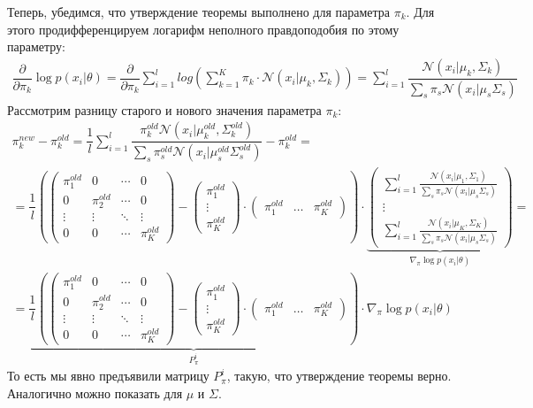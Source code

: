 \documentclass[12pt,fleqn]{article}
\begin{document}
\begin{vkProof}
Теперь, убедимся, что утверждение теоремы выполнено для параметра $\pi_k$. Для этого продифференцируем логарифм неполного правдоподобия по этому параметру:
\begin{gather*}
\dfrac{\partial}{\partial \pi_k} \log p(x_i|\theta) = \dfrac{\partial}{\partial \pi_k} \sum\limits_{i=1}^l log\left(\sum\limits_{k=1}^K \pi_k \cdot \mathcal{N}(x_i|\mu_k,\Sigma_k)\right)=\sum\limits_{i=1}^l
\dfrac{\mathcal{N}(x_i|\mu_{k}, \Sigma_{k})}{\sum\limits_{s}\pi_s \mathcal{N}(x_i|\mu_{s}\Sigma_{s})}
\end{gather*}
Рассмотрим разницу старого и нового значения параметра $\pi_k$:
\begin{gather*}
\pi_k^{new}-\pi_k^{old} = \dfrac{1}{l}\sum\limits_{i=1}^l
\dfrac{\pi_k^{old} \mathcal{N}(x_i|\mu_{k}^{old}, \Sigma_{k}^{old})}{\sum\limits_{s}\pi_s^{old} \mathcal{N}(x_i|\mu_{s}^{old}\Sigma_{s}^{old})} - \pi_k^{old}=\\
=\dfrac{1}{l}\left(\begin{pmatrix}
\pi_1^{old}&0&\cdots &0\\ 
0&\pi_2^{old}&\cdots &0\\
\vdots &\vdots &\ddots &\vdots \\
0&0&\cdots & \pi_K^{old}
\end{pmatrix} - \begin{pmatrix}
\pi_1^{old}\\ 
\vdots\\
\pi_K^{old}
\end{pmatrix} \cdot \begin{pmatrix}
\pi_1^{old} & \ldots & \pi_K^{old}
\end{pmatrix}\right) \cdot \underbrace{\begin{pmatrix}
\sum\limits_{i=1}^l
\frac{\mathcal{N}(x_i|\mu_{1}, \Sigma_{1})}{\sum\limits_{s}\pi_s \mathcal{N}(x_i|\mu_{s}\Sigma_{s})}\\ 
\vdots\\
\sum\limits_{i=1}^l
\frac{\mathcal{N}(x_i|\mu_{K}, \Sigma_{K})}{\sum\limits_{s}\pi_s \mathcal{N}(x_i|\mu_{s}\Sigma_{s})}
\end{pmatrix} }_{\nabla_{\pi}\log p(x_i|\theta)}=\\
=\underbrace{\dfrac{1}{l}\left(\begin{pmatrix}
\pi_1^{old}&0&\cdots &0\\ 
0&\pi_2^{old}&\cdots &0\\
\vdots &\vdots &\ddots &\vdots \\
0&0&\cdots & \pi_K^{old}
\end{pmatrix} - \begin{pmatrix}
\pi_1^{old}\\ 
\vdots\\
\pi_K^{old}
\end{pmatrix} \cdot \begin{pmatrix}
\pi_1^{old} & \ldots & \pi_K^{old}
\end{pmatrix}\right)}_{P_{\pi}^i} \cdot \nabla_{\pi}\log p(x_i|\theta)
\end{gather*}
То есть мы явно предъявили матрицу $P_{\pi}^i$, такую, что утверждение теоремы верно. Аналогично можно показать для $\mu$ и $\Sigma$.
\end{vkProof}
\end{document}
